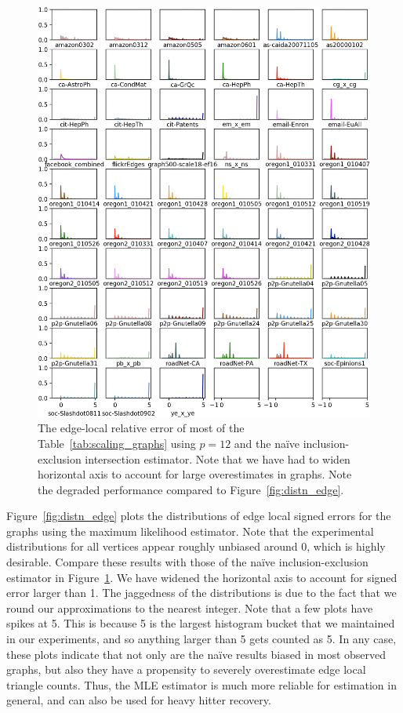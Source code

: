 \documentclass[10]{report}
\begin{document}
\begin{figure}
	\centerline{\includegraphics[width=1.0\columnwidth]{distn_naive_edge_total}}
	\caption{The edge-local relative error of most of the  Table~\ref{tab:scaling_graphs} using $p=12$ and the na\"ive inclusion-exclusion intersection estimator. 
	Note that we have had to widen horizontal axis to account for large overestimates in graphs. 
	Note the degraded performance compared to Figure~\ref{fig:distn_edge}.
	\label{fig:distn_naive_edge}}
\end{figure}


Figure~\ref{fig:distn_edge} plots the distributions of edge local signed errors for the graphs using the maximum likelihood estimator. 
Note that the experimental distributions for all vertices appear roughly unbiased around 0, which is highly desirable.
Compare these results with those of the na\"ive inclusion-exclusion estimator in Figure~\ref{fig:distn_naive_edge}.
We have widened the horizontal axis to account for signed error larger than 1.
The jaggedness of the distributions is due to the fact that we round our approximations to the nearest integer.
Note that a few plots have spikes at 5. 
This is because 5 is the largest histogram bucket that we maintained in our experiments, and so anything larger than 5 gets counted as 5. 
In any case, these plots indicate that not only are the na\"ive results biased in most observed graphs, but also they have a propensity to severely overestimate edge local triangle counts.
Thus, the MLE estimator is much more reliable for estimation in general, and can also be used for heavy hitter recovery.
\end{document}

